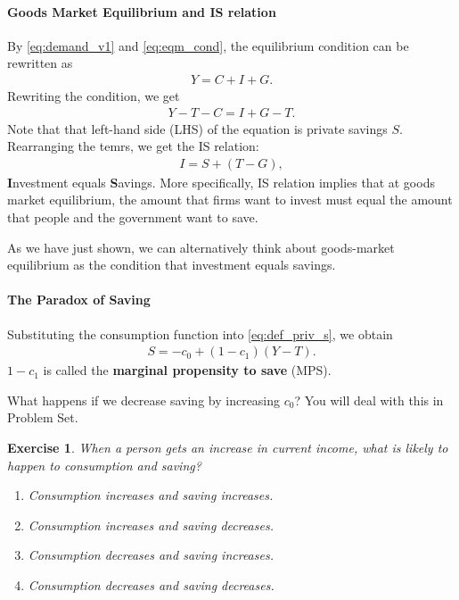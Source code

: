 \documentclass[12pt]{article}
\newtheorem{exercise}{Exercise}
\begin{document}
\paragraph{Goods Market Equilibrium and IS relation}
By \eqref{eq:demand_v1} and \eqref{eq:eqm_cond}, the equilibrium condition can be rewritten as
\begin{align}\label{eq:eqm_cond_v2}
    Y = C + I + G.
\end{align}
Rewriting the condition, we get
\begin{align*}
    Y - T - C = I + G - T.
\end{align*}
Note that that left-hand side (LHS) of the equation is private savings $S$. Rearranging the temrs, we get the IS relation:
\begin{align*}
    I = S + (T-G),
\end{align*}
\textbf{I}nvestment equals \textbf{S}avings. More specifically, IS relation implies that at goods market equilibrium, the amount that firms want to invest must equal the amount that people and the government want to save.

As we have just shown, we can alternatively think about goods-market equilibrium as the condition that investment equals savings.

\paragraph{The Paradox of Saving}
Substituting the consumption function into \eqref{eq:def_priv_s}, we obtain
\begin{align*}
    S = -c_0 + (1-c_1)(Y-T).
\end{align*}
$1-c_1$ is called the \textbf{marginal propensity to save} (MPS).

What happens if we decrease saving by increasing $c_0$? You will deal with this in Problem Set.

\begin{exercise}
    When a person gets an increase in current income, what is likely to happen to consumption and saving?
    \begin{enumerate}[label=\Alph*.]
        \item Consumption increases and saving increases.
        \item Consumption increases and saving decreases.
        \item Consumption decreases and saving increases.
        \item Consumption decreases and saving decreases.
    \end{enumerate}
\end{exercise}
\end{document}
